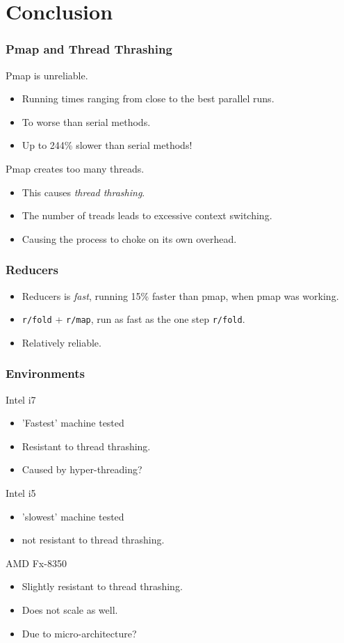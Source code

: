 \documentclass{beamer}
\newcommand{\clocode}[1]{{\texttt {#1}}}
\begin{document}
\section{Conclusion}
\begin{frame}
\frametitle{Pmap and Thread Thrashing}
	Pmap is unreliable.
	\begin{itemize}
	\item Running times ranging from close to the best parallel runs.
	\item To worse than serial methods.
	\item Up to 244\% slower than serial methods!
	\end{itemize}
Pmap creates too many threads.
	\begin{itemize}
	\item This causes \emph{thread thrashing}.
	\item The number of treads leads to excessive context switching.
	\item Causing the process to choke on its own overhead.
	\end{itemize}
\end{frame}

\begin{frame}
\frametitle{Reducers}
	\begin{itemize}
	\item Reducers is \emph{fast}, running 15\% faster than pmap, when pmap was working.
	\item \clocode{r/fold} + \clocode{r/map}, run as fast as the one step \clocode{r/fold}.
	\item Relatively reliable.
	\end{itemize}
\end{frame}

\begin{frame}
\frametitle{Environments}
Intel i7 
	\begin{itemize}
	\item 'Fastest' machine tested
	\item Resistant to thread thrashing.
	\item Caused by hyper-threading?
	\end{itemize}
Intel i5
	\begin{itemize}
	\item 'slowest' machine tested
	\item not resistant to thread thrashing.
	\end{itemize}
AMD Fx-8350
	\begin{itemize}
	\item Slightly resistant to thread thrashing.
	\item Does not scale as well.
	\item Due to micro-architecture?
	\end{itemize}
	
\end{frame}
\end{document}

